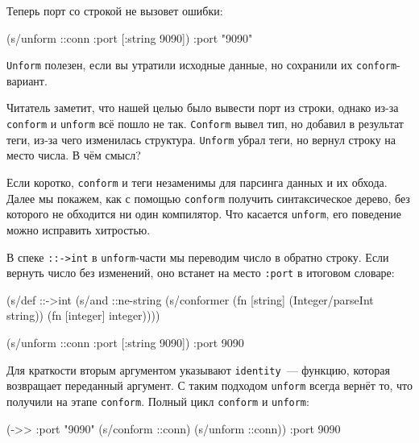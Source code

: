 \noindent
Теперь порт со строкой не вызовет ошибки:

\begin{english}
  \begin{clojure}
(s/unform ::conn {:port [:string 9090]})
{:port "9090"}
  \end{clojure}
\end{english}

\verb|Unform| полезен, если вы утратили исходные данные, но сохранили их
\verb|conform|-вариант.

Читатель заметит, что нашей целью было вывести порт из строки, однако из-за
\verb|conform| и \verb|unform| всё пошло не так. \verb|Conform| вывел тип,
но добавил в результат теги, из-за чего изменилась структура. \verb|Unform|
убрал теги, но вернул строку на место числа. В чём смысл?

Если коротко, \verb|conform| и теги незаменимы для парсинга данных и их
обхода. Далее мы покажем, как с помощью \verb|conform| получить синтаксическое
дерево, без которого не обходится ни один компилятор. Что касается
\verb|unform|, его поведение можно исправить хитростью.

В спеке \verb|::->int| в \verb|unform|-части мы переводим число в обратно
строку. Если вернуть число без изменений, оно встанет на место \verb|:port| в
итоговом словаре:

\begin{english}
  \begin{clojure}
(s/def ::->int
  (s/and
   ::ne-string
   (s/conformer
    (fn [string]
      (Integer/parseInt string))
    (fn [integer]
      integer))))

(s/unform ::conn {:port [:string 9090]})
{:port 9090}
  \end{clojure}
\end{english}


Для краткости вторым аргументом указывают \verb|identity|~--- функцию, которая
возвращает переданный аргумент. С таким подходом \verb|unform| всегда
вернёт то, что получили на этапе \verb|conform|. Полный цикл
\verb|conform| и \verb|unform|:

\begin{english}
  \begin{clojure}
(->> {:port "9090"}
     (s/conform ::conn)
     (s/unform ::conn))
{:port 9090}
  \end{clojure}
\end{english}

